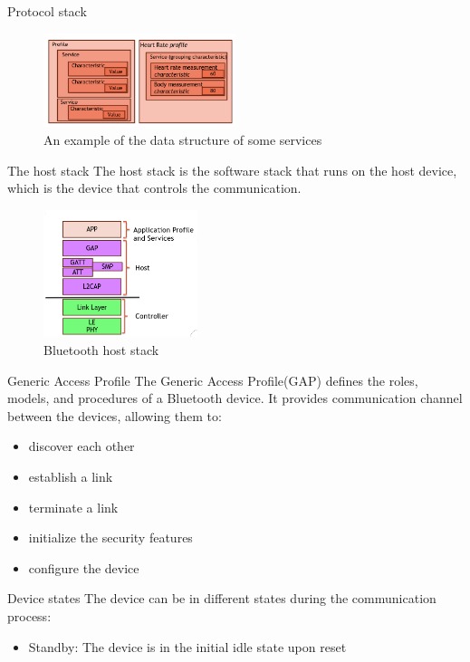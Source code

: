 \begin{section}{Protocol stack}
\begin{figure}[H]
    \centering
    \includegraphics[width=0.5\textwidth]{img/wireless/bluetooth services format.png}
    \caption{An example of the data structure of some services}
  \end{figure}
  \begin{subsection}{The host stack}
    The host stack is the software stack that runs on the host device, which is the device that 
    controls the communication. 
    \begin{figure}[H]
      \centering
      \includegraphics[width=0.4\textwidth]{img/wireless/bluetooth host stack.png}
      \caption{Bluetooth host stack}
    \end{figure}
    \begin{subsubsection}{Generic Access Profile}
      The Generic Access Profile(GAP) defines the roles, models, and procedures of a Bluetooth device.
      It provides communication channel between the devices, allowing them to:
      \begin{itemize}
        \item discover each other
        \item establish a link 
        \item terminate a link
        \item initialize the security features
        \item configure the device
      \end{itemize}
    \end{subsubsection}
    \begin{subsubsection}{Device states}
      The device can be in different states during the communication process:
      \begin{itemize}
      \item Standby: The device is in the initial idle state upon reset

\end{itemize}
\end{subsubsection}
\end{subsection}
\end{section}
